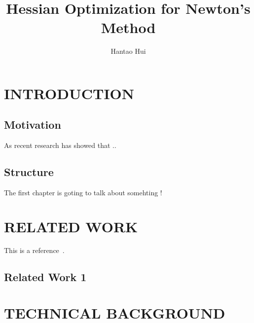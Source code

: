 \documentclass[
	11pt, 
	a4paper, 
	oneside,  
	final, 
]{report}
\title{Hessian Optimization for Newton's Method}
\author{Hantao Hui}
\begin{document}
\maketitle
\newpage
\tableofcontents

\chapter{INTRODUCTION}
\section{Motivation}
As recent research has showed that ..
\section{Structure}
The first chapter is goting to talk about somehting !
\chapter{RELATED WORK}

This is a reference~\cite{Foley:1990}.

\section{Related Work 1}






\chapter{TECHNICAL BACKGROUND}
\end{document}
